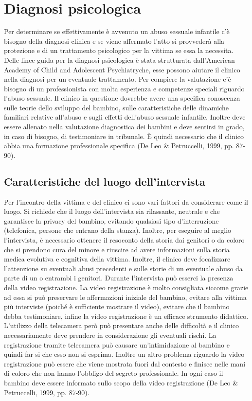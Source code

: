 \section{Diagnosi psicologica}
Per determinare se effettivamente è avvenuto un abuso sessuale infantile c’è bisogno della diagnosi clinica e se viene affermato l’atto si provvederà alla protezione e di un trattamento psicologico per la vittima se essa la necessita. Delle linee guida per la diagnosi psicologica è stata strutturata dall’American Academy of Child and Adolescent Psychiatryche, esse possono aiutare il clinico nella diagnosi per un eventuale trattamento. Per compiere la valutazione c’è bisogno di un professionista con molta esperienza e competenze speciali riguardo l’abuso sessuale. Il clinico in questione dovrebbe avere una specifica conoscenza sulle teorie dello sviluppo del bambino, sulle caratteristiche delle dinamiche familiari relative all’abuso e sugli effetti dell’abuso sessuale infantile. Inoltre deve essere allenato nella valutazione diagnostica dei bambini e deve sentirsi in grado, in caso di bisogno, di testimoniare in tribunale. È quindi necessario che il clinico abbia una formazione professionale specifica (De Leo & Petruccelli, 1999, pp. 87-90).
\subsection{Caratteristiche del luogo dell’intervista}
Per l’incontro della vittima e del clinico ci sono vari fattori da considerare come il luogo. Si richiede che il luogo dell’intervista sia rilassante, neutrale e che garantisce la privacy del bambino, evitando qualsiasi tipo d’interruzione (telefonica, persone che entrano della stanza). Inoltre, per eseguire al meglio l’intervista, è necessario ottenere il resoconto della storia dai genitori o da coloro che si prendono cura del minore e riuscire ad avere informazioni sulla storia medica evolutiva e cognitiva della vittima. Inoltre, il clinico deve focalizzare l’attenzione su eventuali abusi precedenti e sulle storie di un eventuale abuso da parte di un o entrambi i genitori. Durante l’intervista può esserci la presenza della video registrazione. La video registrazione è molto consigliata siccome grazie ad essa si può preservare le affermazioni iniziale del bambino, evitare alla vittima più interviste (poiché è sufficiente mostrare il video), evitare che il bambino debba testimoniare, infine la video registrazione è un efficace strumento didattico. L’utilizzo della telecamera però può presentare anche delle difficoltà e il clinico necessariamente deve prendere in considerazione gli eventuali rischi. La registrazione tramite telecamera può causare un’intimidazione al bambino e quindi far si che esso non si esprima. Inoltre un altro problema riguardo la video registrazione può essere che viene mostrata fuori dal contesto e finisce nelle mani di coloro che non hanno l’obbligo del segreto professionale. In ogni caso il bambino deve essere informato sullo scopo della video registrazione (De Leo & Petruccelli, 1999, pp. 87-90).
